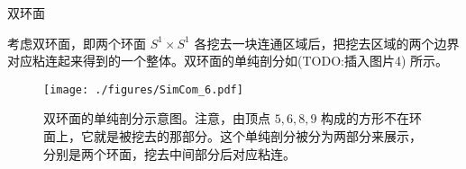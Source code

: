 \begin{example}{双环面}

考虑双环面，即两个环面 $S^1\times S^1$ 各挖去一块连通区域后，把挖去区域的两个边界对应粘连起来得到的一个整体。双环面的单纯剖分如(TODO:插入图片4) 所示。

\begin{figure}[ht]
\centering
\texttt{[image: ./figures/SimCom\_6.pdf]}
\caption{双环面的单纯剖分示意图。注意，由顶点 $5, 6, 8, 9$ 构成的方形不在环面上，它就是被挖去的那部分。这个单纯剖分被分为两部分来展示，分别是两个环面，挖去中间部分后对应粘连。} \label{SimCom_fig6}
\end{figure}


\end{example}
